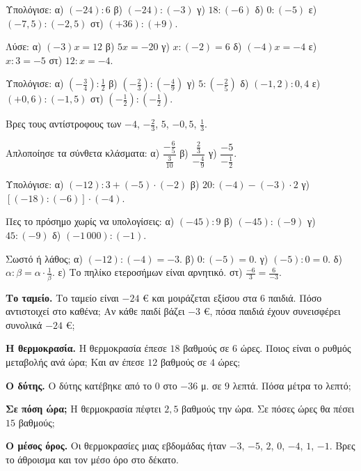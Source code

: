 

\ex Υπολόγισε: α) $(-24):6$ \quad β) $(-24):(-3)$ \quad γ) $18:(-6)$ \quad δ) $0:(-5)$ \quad ε) $(-7{,}5):(-2{,}5)$ \quad στ) $(+36):(+9)$.

\ex Λύσε: α) $(-3)x=12$ \quad β) $5x=-20$ \quad γ) $x:(-2)=6$ \quad δ) $(-4)x=-4$ \quad ε) $x:3=-5$ \quad στ) $12:x=-4$.

\ex Υπολόγισε: α) $\left(-\frac{3}{4}\right):\frac{1}{2}$ \quad β) $\left(-\frac{2}{3}\right):\left(-\frac{4}{9}\right)$ \quad γ) $5:\left(-\frac{2}{5}\right)$ \quad δ) $(-1{,}2):0{,}4$ \quad ε) $(+0{,}6):(-1{,}5)$ \quad στ) $\left(-\frac{1}{2}\right):\left(-\frac{1}{2}\right)$.

\ex Βρες τους αντίστροφους των $-4$, $-\frac{2}{3}$, $5$, $-0{,}5$, $\frac{1}{3}$.

\ex Απλοποίησε τα σύνθετα κλάσματα: α) $\dfrac{-\frac{6}{5}}{\frac{3}{10}}$ \quad β) $\dfrac{\frac{2}{3}}{-\frac{4}{9}}$ \quad γ) $\dfrac{-5}{-\frac{1}{2}}$.

\ex Υπολόγισε: α) $(-12):3+(-5)\cdot(-2)$ \quad β) $20:(-4)-(-3)\cdot2$ \quad γ) $[(-18):(-6)]\cdot(-4)$.

\ex Πες το πρόσημο χωρίς να υπολογίσεις: α) $(-45):9$ \quad β) $(-45):(-9)$ \quad γ) $45:(-9)$ \quad δ) $(-1\,000):(-1)$.

\ex Σωστό ή λάθος; α) $(-12):(-4)=-3$. \quad β) $0:(-5)=0$. \quad γ) $(-5):0=0$. \quad δ) $\alpha:\beta=\alpha\cdot\frac{1}{\beta}$. \quad ε) Το πηλίκο ετεροσήμων είναι αρνητικό. \quad στ) $\frac{-6}{3}=\frac{6}{-3}$.


\ex \textbf{Το ταμείο.} Το ταμείο είναι $-24$ € και μοιράζεται εξίσου στα $6$ παιδιά. Πόσο αντιστοιχεί στο καθένα; Αν κάθε παιδί βάζει $-3$ €, πόσα παιδιά έχουν συνεισφέρει συνολικά $-24$ €;

\ex \textbf{Η θερμοκρασία.} Η θερμοκρασία έπεσε $18$ βαθμούς σε $6$ ώρες. Ποιος είναι ο ρυθμός μεταβολής ανά ώρα; Και αν έπεσε $12$ βαθμούς σε $4$ ώρες;

\ex \textbf{Ο δύτης.} Ο δύτης κατέβηκε από το $0$ στο $-36$ μ. σε $9$ λεπτά. Πόσα μέτρα το λεπτό;

\ex \textbf{Σε πόση ώρα;} Η θερμοκρασία πέφτει $2{,}5$ βαθμούς την ώρα. Σε πόσες ώρες θα πέσει $15$ βαθμούς;

\ex \textbf{Ο μέσος όρος.} Οι θερμοκρασίες μιας εβδομάδας ήταν $-3$, $-5$, $2$, $0$, $-4$, $1$, $-1$. Βρες το άθροισμα και τον μέσο όρο στο δέκατο.

